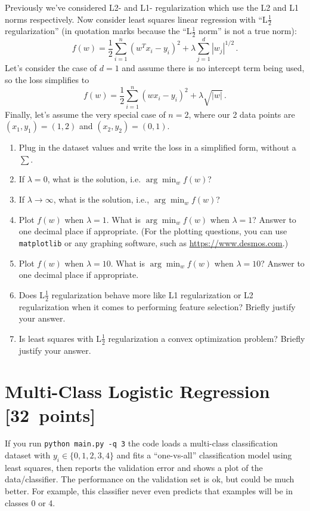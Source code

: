 \documentclass{article}
\newcommand{\blu}[1]{{\textcolor{blu}{#1}}}
\let\ask\blu
\newcommand\pts[1]{\textcolor{pointscolour}{[#1~points]}}
\begin{document}
Previously we've considered L2- and L1- regularization which use the L2 and L1 norms respectively. Now consider
least squares linear regression with ``L$\frac12$ regularization'' (in quotation marks because the ``L$\frac12$ norm'' is not a true norm):
\[
f(w) = \frac{1}{2} \sum_{i=1}^n (w^Tx_i - y_i)^2 + \lambda \sum_{j=1}^d |w_j|^{1/2} \, .
\]
Let's consider the case of $d=1$ and
assume there is no intercept term being used, so the loss simplifies to
\[
f(w) = \frac{1}{2} \sum_{i=1}^n (wx_i - y_i)^2 + \lambda \sqrt{|w|} \, .
\]
Finally, let's assume the very special case of $n=2$,
where our 2 data points are $(x_1,y_1)=(1,2)$ and $(x_2,y_2)=(0,1)$.

\begin{enumerate}
\item \ask{Plug in the dataset values and write the loss in a simplified form, without a $\sum$.}
\item \ask{If $\lambda=0$, what is the solution, i.e. $\arg \min_w f(w)$?}
\item If $\lambda\rightarrow \infty$, what is the solution, i.e., $\arg \min_w f(w)$?
\item \ask{Plot $f(w)$ when $\lambda = 1$. What is $\arg \min_w f(w)$ when $\lambda=1$?} Answer to one decimal place if appropriate. (For the plotting questions, you can use \texttt{matplotlib} or any graphing software, such as \url{https://www.desmos.com}.)
\item \ask{Plot $f(w)$ when $\lambda = 10$. What is $\arg \min_w f(w)$ when $\lambda=10$?} Answer to one decimal place if appropriate.
\item \ask{Does L$\frac12$ regularization behave more like L1 regularization or L2 regularization
when it comes to performing feature selection?} Briefly justify your answer.
\item \ask{Is least squares with L$\frac12$ regularization
a convex optimization problem?} Briefly justify your answer.
\end{enumerate}




\clearpage
\section{Multi-Class Logistic Regression \pts{32}}

If you run \verb|python main.py -q 3| the code loads a multi-class
classification dataset with $y_i \in \{0,1,2,3,4\}$ and fits a ``one-vs-all'' classification
model using least squares, then reports the validation error and shows a plot of the data/classifier.
The performance on the validation set is ok, but could be much better.
For example, this classifier never even predicts that examples will be in classes 0 or 4.
\end{document}
